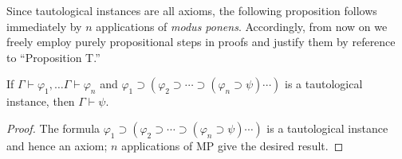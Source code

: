 \documentclass[../../include/open-logic-section]{subfiles}
\begin{document}
\begin{explain}
Since tautological instances are all axioms, the following proposition
follows immediately by $n$ applications of \emph{modus
  ponens}. Accordingly, from now on we freely employ purely
propositional steps in proofs and justify them by reference to
``Proposition T.''
\end{explain}

\begin{prop}
  If $\Gamma \vdash \varphi_1 ,\ldots \Gamma \vdash \varphi_n$ and
  $\varphi_1 \supset (\varphi_2 \supset \cdots \supset(\varphi_n
  \supset \psi) \cdots )$ is a tautological instance, then $\Gamma
  \vdash \psi$.
\end{prop}

\begin{proof}
  The formula   $\varphi_1 \supset (\varphi_2 \supset \cdots \supset(\varphi_n
  \supset \psi) \cdots )$ is a tautological instance and hence an
  axiom; $n$ applications of MP give the desired result.
\end{proof}
\end{document}
